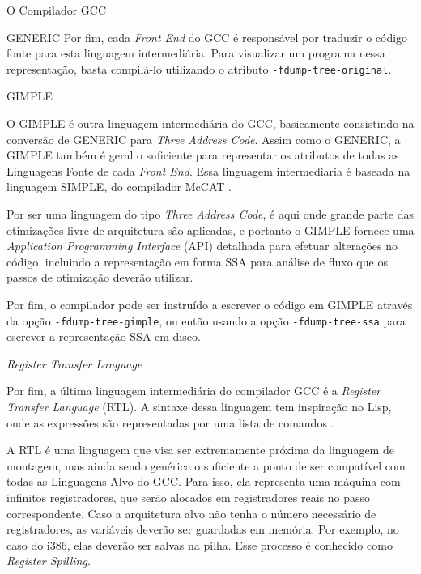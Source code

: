 \begin{section}{O Compilador GCC}
\begin{subsection}{GENERIC}
    Por fim, cada \textit{Front End} do GCC é responsável por traduzir o
código fonte para esta linguagem intermediária. Para visualizar um programa
nessa representação, basta compilá-lo utilizando o atributo
\texttt{-fdump-tree-original}.

\end{subsection}

\begin{subsection}{GIMPLE}

O GIMPLE é outra linguagem intermediária do GCC, basicamente consistindo na
conversão de GENERIC para \textit{Three Address Code}. Assim como o
GENERIC, a GIMPLE também é geral o suficiente para representar os atributos
de todas as Linguagens Fonte de cada \textit{Front End}.  Essa linguagem
intermediaria é baseada na linguagem SIMPLE, do compilador McCAT \citep{gimple}.

    Por ser uma linguagem do tipo \textit{Three Address Code}, é aqui onde
grande parte das otimizações livre de arquitetura são aplicadas, e portanto o
GIMPLE fornece uma \textit{Application Programming Interface} (API) detalhada
para efetuar alterações no código, incluindo a representação em forma SSA para análise
de fluxo que os passos de otimização deverão utilizar.

    Por fim, o compilador pode ser instruído a escrever o código em
GIMPLE através da opção \texttt{-fdump-tree-gimple}, ou então usando
a opção \texttt{-fdump-tree-ssa} para escrever a representação SSA
em disco.

\end{subsection}

\begin{subsection}{\textit{Register Transfer Language}}

    Por fim, a última linguagem intermediária do compilador GCC é a
\textit{Register Transfer Language} (RTL). A sintaxe dessa linguagem
tem inspiração no Lisp, onde as expressões são representadas por uma
lista de comandos \citep{rtl}.

    A RTL é uma linguagem que visa ser extremamente próxima da linguagem
de montagem, mas ainda sendo genérica o suficiente a ponto de ser compatível
com todas as Linguagens Alvo do GCC.
Para isso, ela representa uma máquina com infinitos
registradores, que serão alocados em registradores reais no passo correspondente.
Caso a arquitetura alvo não tenha o número necessário de
registradores, as variáveis deverão ser guardadas em memória. Por exemplo,
no caso do i386, elas deverão ser salvas na pilha. Esse processo é conhecido
como \textit{Register Spilling}.


\end{subsection}
\end{section}
